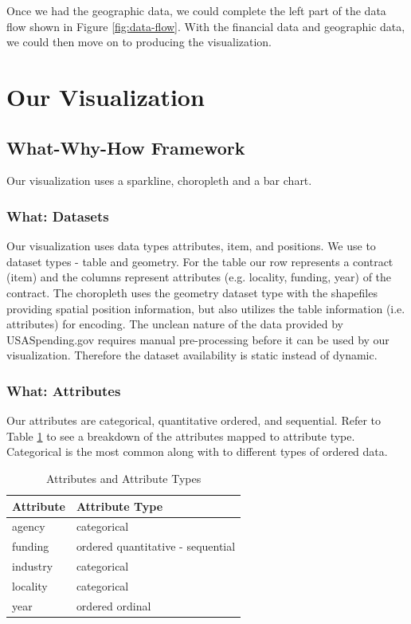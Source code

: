 \documentclass[10pt,journal,compsoc]{IEEEtran}
\begin{document}
Once we had the geographic data, we could complete the left part of the data flow shown in Figure \ref{fig:data-flow}.  With the financial data and geographic data, we could then move on to producing the visualization.

\section{Our Visualization}
\subsection{What-Why-How Framework}
Our visualization uses a sparkline, choropleth and a bar chart.

\subsubsection{What: Datasets}

Our visualization uses data types attributes, item, and positions. We use to dataset types - table and geometry. For the table our row represents a contract (item) and the columns represent attributes (e.g. locality, funding, year) of the contract. The choropleth uses the geometry dataset type with the shapefiles providing spatial position information, but also utilizes the table information (i.e. attributes) for encoding. The unclean nature of the data provided by USASpending.gov requires manual pre-processing before it can be used by our visualization. Therefore the dataset availability is static instead of dynamic.

\subsubsection{What: Attributes}

Our attributes are categorical, quantitative ordered, and sequential. Refer to Table \ref{tab:attribute-type} to see a breakdown of the attributes mapped to attribute type. Categorical is the most common along with to different types of ordered data.

\begin{table}[t]
\centering
\begin{tabular}{l | l}
\textbf{Attribute} & \textbf{Attribute Type} \\
\hline
agency & categorical\\
\hline
funding & ordered quantitative - sequential \\
\hline
industry & categorical \\
\hline
locality & categorical \\
\hline
year & ordered ordinal \\

\hline
\end{tabular}

\caption{Attributes and Attribute Types}
\label{tab:attribute-type}

\end{table} 
\end{document}
